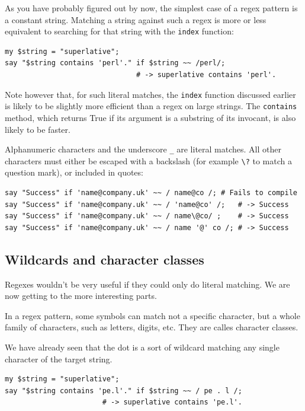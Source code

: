 As you have probably figured out by now, the simplest case 
of a regex pattern is a constant string. Matching a string 
against such a regex is more or less equivalent to searching 
for that string with the {\tt index} function:

\begin{verbatim}
my $string = "superlative";
say "$string contains 'perl'." if $string ~~ /perl/;
                               # -> superlative contains 'perl'.
\end{verbatim}
%

Note however that, for such literal matches, the {\tt index} 
function discussed earlier is likely to be slightly more 
efficient than a regex on large strings. The {\tt contains} 
method, which returns True if its argument is a substring of 
its invocant, is also likely to be faster.

Alphanumeric characters and the underscore \verb'_' are literal 
matches. All other characters must either be escaped with a 
backslash (for example \verb'\?' to match a question mark), 
or included in quotes:

\begin{verbatim}
say "Success" if 'name@company.uk' ~~ / name@co /; # Fails to compile
say "Success" if 'name@company.uk' ~~ / 'name@co' /;   # -> Success
say "Success" if 'name@company.uk' ~~ / name\@co/ ;    # -> Success
say "Success" if 'name@company.uk' ~~ / name '@' co /; # -> Success
\end{verbatim}
%


\subsection{Wildcards and character classes}

Regexes wouldn't be very useful if they could only do literal 
matching. We are now getting to the more interesting parts.

In a regex pattern, some symbols can match not a specific character, 
but a whole family of characters, such as letters, digits, etc. 
They are calles character classes.

We have already seen that the dot is a sort of wildcard 
matching any single character of the target string. 

\begin{verbatim}
my $string = "superlative";
say "$string contains 'pe.l'." if $string ~~ / pe . l /;
                       # -> superlative contains 'pe.l'.
\end{verbatim}
%


